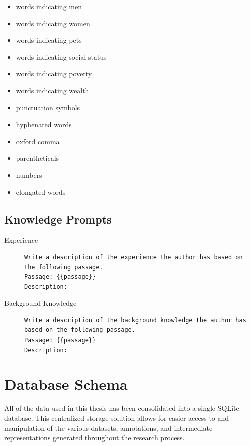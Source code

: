 \begin{multicols}{2}
\begin{itemize}[nolistsep]
    \item words indicating men
    \item words indicating women
    \item words indicating pets
    \item words indicating social status
    \item words indicating poverty
    \item words indicating wealth
    \item punctuation symbols
    \item hyphenated words
    \item oxford comma
    \item parentheticals
    \item numbers
    \item elongated words
  \end{itemize}
\end{multicols}

\subsection{Knowledge Prompts}
\label{sec:appendix:knowledgePrompts}
\begin{description}
  \item[Experience]\leavevmode \newline
        \begin{minipage}{\linewidth}
          \begin{lstlisting}
Write a description of the experience the author has based on the following passage.
Passage: {{passage}}
Description:
\end{lstlisting}
        \end{minipage}
  \item[Background Knowledge]\leavevmode \newline
        \begin{minipage}{\linewidth}
          \begin{lstlisting}
Write a description of the background knowledge the author has based on the following passage.
Passage: {{passage}}
Description:
\end{lstlisting}
        \end{minipage}
\end{description}

\section{Database Schema}
\label{sec:appendix:databaseSchema}
All of the data used in this thesis has been consolidated into a single SQLite database. This centralized storage solution allows for easier access to and manipulation of the various datasets, annotations, and intermediate representations generated throughout the research process.

